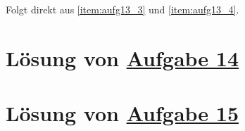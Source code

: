 


Folgt direkt aus \ref{item:aufg13_3} und \ref{item:aufg13_4}.

\section{Lösung von 
	\texorpdfstring{\hyperref[aufg:14]{Aufgabe 14}}{}
}\label{loes:14}

\section{Lösung von 
	\texorpdfstring{\hyperref[aufg:15]{Aufgabe 15}}{}
}\label{loes:15}
